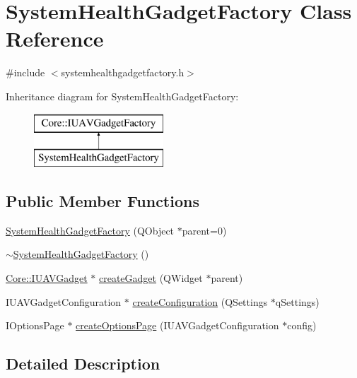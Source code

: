 \hypertarget{class_system_health_gadget_factory}{\section{\-System\-Health\-Gadget\-Factory \-Class \-Reference}
\label{class_system_health_gadget_factory}
}


{\ttfamily \#include $<$systemhealthgadgetfactory.\-h$>$}

\-Inheritance diagram for \-System\-Health\-Gadget\-Factory\-:\begin{figure}[H]
\begin{center}
\leavevmode
\includegraphics[height=2.000000cm]{class_system_health_gadget_factory}
\end{center}
\end{figure}
\subsection*{\-Public \-Member \-Functions}
\begin{DoxyCompactItemize}
\item 
\hyperlink{group___system_health_plugin_gaf19ba5915588fac5dd9f368210271115}{\-System\-Health\-Gadget\-Factory} (\-Q\-Object $\ast$parent=0)
\item 
\hyperlink{group___system_health_plugin_ga6d9272ee992e8241b7a4483dce8ff330}{$\sim$\-System\-Health\-Gadget\-Factory} ()
\item 
\hyperlink{class_core_1_1_i_u_a_v_gadget}{\-Core\-::\-I\-U\-A\-V\-Gadget} $\ast$ \hyperlink{group___system_health_plugin_ga042cc7fba53df83dbb7e06626f2b1006}{create\-Gadget} (\-Q\-Widget $\ast$parent)
\item 
\-I\-U\-A\-V\-Gadget\-Configuration $\ast$ \hyperlink{group___system_health_plugin_ga569580fcea35d0f1f9433378dd734624}{create\-Configuration} (\-Q\-Settings $\ast$q\-Settings)
\item 
\-I\-Options\-Page $\ast$ \hyperlink{group___system_health_plugin_gaae1b2e7613b4024f309fd5480fcbe028}{create\-Options\-Page} (\-I\-U\-A\-V\-Gadget\-Configuration $\ast$config)
\end{DoxyCompactItemize}


\subsection{\-Detailed \-Description}


